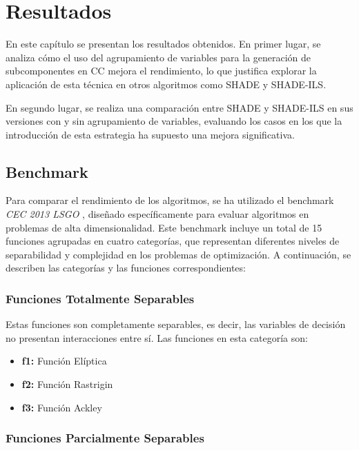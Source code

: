 
\chapter{Resultados}

En este capítulo se presentan los resultados obtenidos. En primer lugar, se analiza cómo el uso del agrupamiento de variables para la generación de subcomponentes en CC mejora el rendimiento, lo que justifica explorar la aplicación de esta técnica en otros algoritmos como SHADE y SHADE-ILS.

En segundo lugar, se realiza una comparación entre SHADE y SHADE-ILS en sus versiones con y sin agrupamiento de variables, evaluando los casos en los que la introducción de esta estrategia ha supuesto una mejora significativa.

\section{Benchmark}

Para comparar el rendimiento de los algoritmos, se ha utilizado el benchmark \textit{CEC 2013 LSGO} \cite{cec_2013_lsgo}, diseñado específicamente para evaluar algoritmos en problemas de alta dimensionalidad. Este benchmark incluye un total de 15 funciones agrupadas en cuatro categorías, que representan diferentes niveles de separabilidad y complejidad en los problemas de optimización. A continuación, se describen las categorías y las funciones correspondientes:

\subsection{Funciones Totalmente Separables}

Estas funciones son completamente separables, es decir, las variables de decisión no presentan interacciones entre sí. Las funciones en esta categoría son:
\begin{itemize}
    \item \textbf{f1:} Función Elíptica
    \item \textbf{f2:} Función Rastrigin
    \item \textbf{f3:} Función Ackley
\end{itemize}

\subsection{Funciones Parcialmente Separables}

